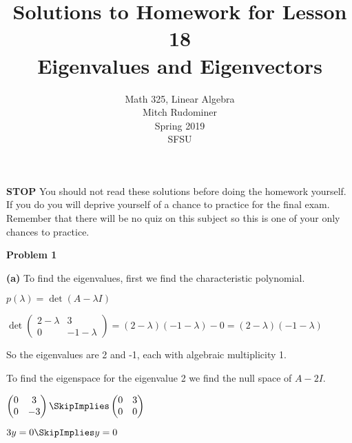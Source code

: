 \documentclass[oneside,12pt]{amsart}
\begin{document}
\title{Solutions to Homework for Lesson 18 \\ Eigenvalues and Eigenvectors}
\author{Math 325, Linear Algebra \\ Mitch Rudominer \\ Spring 2019 \\ SFSU }
\date{}

\maketitle

\bigskip

\textbf{STOP} You should not read these solutions before doing the homework yourself.
If you do you will deprive yourself of a chance to practice for the final exam.
Remember that there will be no quiz on this subject so this is one of your only
chances to practice.

\bigskip

\textbf{Problem 1}

\bigskip

\textbf{(a)} To find the eigenvalues, first we find the characteristic polynomial.

$p(\lambda)=\det(A-\lambda I)$


\bigskip
$
\det
\begin{pmatrix}
2 - \lambda & 3 \\
0 & -1 - \lambda
\end{pmatrix}
= (2-\lambda)(-1-\lambda) - 0 = (2-\lambda)(-1-\lambda)
$

\bigskip

So the eigenvalues are 2 and  -1, each with algebraic multiplicity 1.

\bigskip

To find the eigenspace for the eigenvalue 2 we find the null space of $A-2 I$.

\bigskip

$
\begin{pmatrix}
0 & 3 \\
0 & -3 \\
\end{pmatrix}
\SkipImplies
\begin{pmatrix}
0 & 3 \\
0 & 0 \\
\end{pmatrix}
$

\bigskip

$3y=0 \SkipImplies y=0$

\bigskip
\end{document}
